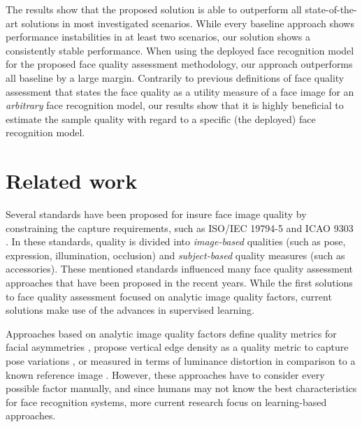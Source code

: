 \documentclass[10pt,twocolumn,letterpaper]{article}
\begin{document}
The results show that the proposed solution is able to outperform all state-of-the-art solutions in most investigated scenarios.
While every baseline approach shows performance instabilities in at least two scenarios, our solution shows a consistently stable performance.
When using the deployed face recognition model for the proposed face quality assessment methodology, our approach outperforms all baseline by a large margin.
Contrarily to previous definitions of face quality assessment \cite{DBLP:journals/corr/Best-RowdenJ17,ISO19794-5-2011,ICAO9303,DBLP:journals/corr/abs-1904-01740} that states the face quality as a utility measure of a face image for an \textit{arbitrary} face recognition model, our results show that it is highly beneficial to estimate the sample quality with regard to a specific (the deployed) face recognition model.



















\section{Related work}
\label{sec:RelatedWork}













Several standards have been proposed for insure face image quality by constraining the capture requirements, such as ISO/IEC 19794-5 \cite{ISO19794-5-2011} and ICAO 9303 \cite{ICAO9303}.
In these standards, quality is divided into \textit{image-based} qualities  (such as pose, expression, illumination, occlusion) and \textit{subject-based} quality measures (such as accessories).
These mentioned standards influenced many face quality assessment approaches that have been proposed in the recent years.
While the first solutions to face quality assessment focused on analytic image quality factors, current solutions make use of the advances in supervised learning.

Approaches based on analytic image quality factors define quality metrics for facial asymmetries \cite{10.1007/978-3-540-74549-5_26, 6197711}, propose vertical edge density as a quality metric to capture pose variations \cite{7935089}, or measured in terms of luminance distortion in comparison to a known reference image \cite{5424029}.
However, these approaches have to consider every possible factor manually, and since humans may not know the best characteristics for face recognition systems, more current research focus on learning-based approaches.
\end{document}
